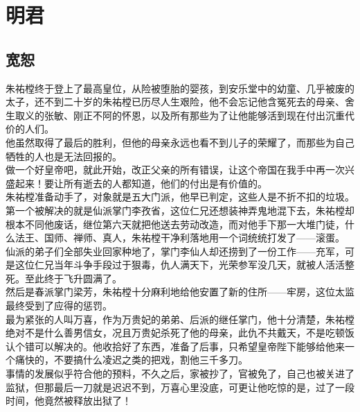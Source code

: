 \section{明君}
\ifnum{}
	\begin{multicols}{\theparacolNo}
\fi
\subsection{宽恕}
朱祐樘终于登上了最高皇位，从险被堕胎的婴孩，到安乐堂中的幼童、几乎被废的太子，还不到二十岁的朱祐樘已历尽人生艰险，他不会忘记他含冤死去的母亲、舍生取义的张敏、刚正不阿的怀恩，以及所有那些为了让他能够活到现在付出沉重代价的人们。\\

他虽然取得了最后的胜利，但他的母亲永远也看不到儿子的荣耀了，而那些为自己牺牲的人也是无法回报的。\\

做一个好皇帝吧，就此开始，改正父亲的所有错误，让这个帝国在我手中再一次兴盛起来！要让所有逝去的人都知道，他们的付出是有价值的。\\

朱祐樘准备动手了，对象就是五大门派，他早已判定，这些人是不折不扣的垃圾。\\

第一个被解决的就是仙派掌门李孜省，这位仁兄还想装神弄鬼地混下去，朱祐樘却根本不同他废话，继位第六天就把他送去劳动改造，而对他手下那一大堆门徒，什么法王、国师、禅师、真人，朱祐樘干净利落地用一个词统统打发了——滚蛋。\\

仙派的弟子们全部失业回家种地了，掌门李仙人却还捞到了一份工作——充军，可是这位仁兄当年斗争手段过于狠毒，仇人满天下，光荣参军没几天，就被人活活整死。至此终于飞升圆满了。\\

然后是春派掌门梁芳，朱祐樘十分麻利地给他安置了新的住所——牢房，这位太监最终受到了应得的惩罚。\\

最为紧张的人叫万喜，作为万贵妃的弟弟、后派的继任掌门，他十分清楚，朱祐樘绝对不是什么善男信女，况且万贵妃杀死了他的母亲，此仇不共戴天，不是吃顿饭认个错可以解决的。他收拾好了东西，准备了后事，只希望皇帝陛下能够给他来一个痛快的，不要搞什么凌迟之类的把戏，割他三千多刀。\\

事情的发展似乎符合他的预料，不久之后，家被抄了，官被免了，自己也被关进了监狱，但那最后一刀就是迟迟不到，万喜心里没底，可更让他吃惊的是，过了一段时间，他竟然被释放出狱了！\\


\end{multicols}
